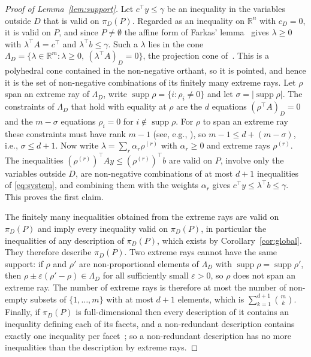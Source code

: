 \documentclass[11pt]{article}
\theoremstyle{definition}
\newcommand{\supp}{\operatorname{supp}}
\begin{document}
\begin{proof}[Proof of Lemma~\ref{lem:support}]
Let $c^{\top}y\le\gamma$ be an inequality in the variables outside $D$ that is valid on $\pi_D(P)$. Regarded as an inequality on $\mathbb{R}^n$ with $c_D=0$, it is valid on $P$, and since $P\neq\emptyset$ the affine form of Farkas' lemma~\cite[Chapter~7]{schrijver1986} gives $\lambda\ge 0$ with $\lambda^{\!\top}\!A=c^{\top}$ and $\lambda^{\!\top}b\le\gamma$. Such a $\lambda$ lies in the cone $\Lambda_D=\{\lambda\in\mathbb{R}^m:\lambda\ge 0,\ (\lambda^{\!\top}\!A)_D=0\}$, the projection cone of~\cite{balas1998}. This is a polyhedral cone contained in the non-negative orthant, so it is pointed, and hence it is the set of non-negative combinations of its finitely many extreme rays. Let $\rho$ span an extreme ray of $\Lambda_D$, write $\supp\rho=\{i:\rho_i\neq 0\}$ and let $\sigma=|\supp\rho|$. The constraints of $\Lambda_D$ that hold with equality at $\rho$ are the $d$ equations $(\rho^{\top}\!A)_D=0$ and the $m-\sigma$ equations $\rho_i=0$ for $i\notin\supp\rho$. For $\rho$ to span an extreme ray these constraints must have rank $m-1$ (see, e.g., \cite[Chapter~8]{schrijver1986}), so $m-1\le d+(m-\sigma)$, i.e., $\sigma\le d+1$. Now write $\lambda=\sum_r\alpha_r\rho^{(r)}$ with $\alpha_r\ge 0$ and extreme rays $\rho^{(r)}$. The inequalities $(\rho^{(r)})^{\top}\!Ay\le(\rho^{(r)})^{\top}b$ are valid on $P$, involve only the variables outside $D$, are non-negative combinations of at most $d+1$ inequalities of \eqref{eq:system}, and combining them with the weights $\alpha_r$ gives $c^{\top}y\le\lambda^{\!\top}b\le\gamma$. This proves the first claim.

The finitely many inequalities obtained from the extreme rays are valid on $\pi_D(P)$ and imply every inequality valid on $\pi_D(P)$, in particular the inequalities of any description of $\pi_D(P)$, which exists by Corollary~\ref{cor:global}. They therefore describe $\pi_D(P)$. Two extreme rays cannot have the same support: if $\rho$ and $\rho'$ are non-proportional elements of $\Lambda_D$ with $\supp\rho=\supp\rho'$, then $\rho\pm\varepsilon(\rho'-\rho)\in\Lambda_D$ for all sufficiently small $\varepsilon>0$, so $\rho$ does not span an extreme ray. The number of extreme rays is therefore at most the number of non-empty subsets of $\{1,\dots,m\}$ with at most $d+1$ elements, which is $\sum_{k=1}^{d+1}\binom{m}{k}$. Finally, if $\pi_D(P)$ is full-dimensional then every description of it contains an inequality defining each of its facets, and a non-redundant description contains exactly one inequality per facet~\cite[Chapter~8]{schrijver1986}; so a non-redundant description has no more inequalities than the description by extreme rays.
\end{proof}
\end{document}

